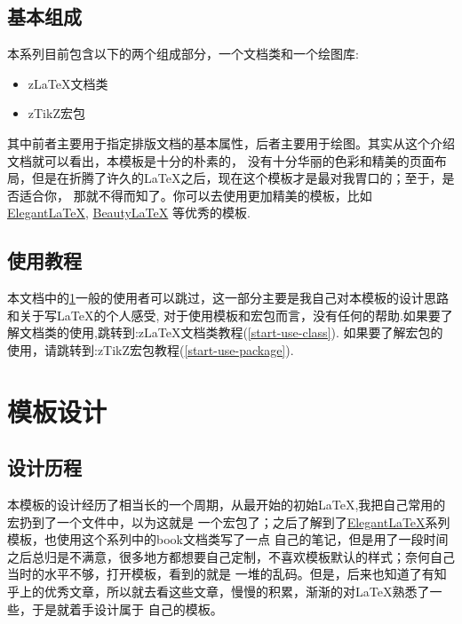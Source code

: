 \subsection{基本组成}
本系列目前包含以下的两个组成部分，一个文档类和一个绘图库:
\begin{itemize}
    \item z\LaTeX{}文档类
    \item zTikZ宏包
\end{itemize}

其中前者主要用于指定排版文档的基本属性，后者主要用于绘图。其实从这个介绍文档就可以看出，本模板是十分的朴素的，
没有十分华丽的色彩和精美的页面布局，但是在折腾了许久的\LaTeX{}之后，现在这个模板才是最对我胃口的；至于，是否适合你，
那就不得而知了。你可以去使用更加精美的模板，比如 \href{https://github.com/ElegantLaTeX}{Elegant\LaTeX{}}, 
\href{https://github.com/BeautyLaTeX/Beautybook}{Beauty\LaTeX{}} 等优秀的模板. 


\subsection{使用教程}
本文档中的\cref{模板设计}一般的使用者可以跳过，这一部分主要是我自己对本模板的设计思路和关于写\LaTeX{}的个人感受,
对于使用模板和宏包而言，没有任何的帮助.如果要了解文档类的使用,跳转到:z\LaTeX{}文档类教程(\cref{start-use-class}).
如果要了解宏包的使用，请跳转到:zTikZ宏包教程(\cref{start-use-package}).


\section{模板设计}\label{模板设计}
\subsection{设计历程}
本模板的设计经历了相当长的一个周期，从最开始的初始\LaTeX{},我把自己常用的宏扔到了一个文件中，以为这就是
一个宏包了；之后了解到了\href{https://github.com/ElegantLaTeX}{Elegant\LaTeX{}}系列模板，也使用这个系列中的book文档类写了一点
自己的笔记，但是用了一段时间之后总归是不满意，很多地方都想要自己定制，不喜欢模板默认的样式；奈何自己当时的水平不够，打开模板，看到的就是
一堆的乱码。但是，后来也知道了有知乎上的优秀文章，所以就去看这些文章，慢慢的积累，渐渐的对\LaTeX{}熟悉了一些，于是就着手设计属于
自己的模板。


